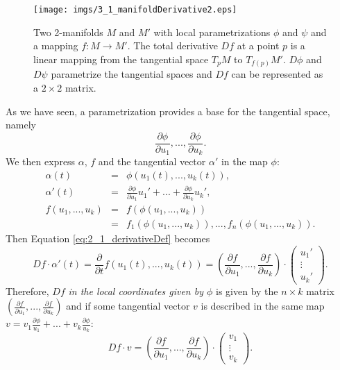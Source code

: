 \begin{figure}
\begin{center}
\texttt{[image: imgs/3\_1\_manifoldDerivative2.eps]}
\end{center}
\caption{Two 2-manifolds $M$ and $M'$ with local parametrizations $\phi$ and $\psi$ and a mapping $f: M \rightarrow M'$. The total derivative $Df$ at a point $p$ is a linear mapping from the tangential space $T_p M$ to $T_{f(p)} M'$. $D\phi$ and $D \psi$ parametrize the tangential spaces and $Df$ can be represented as a $2\times 2$ matrix.}
\label{fig::3_1_manifoldDerivative2}
\end{figure}


As we have seen, a parametrization provides a base for the tangential space, namely 
\[\frac{\partial\phi}{\partial u_1},..., \frac{\partial\phi}{\partial u_k}.\] 
We then express $\alpha$, $f$ and the tangential vector $\alpha'$ in the map $\phi$:
\begin{eqnarray*} \alpha(t) &=& \phi(u_1(t),...,u_k(t)),\\
\alpha'(t) &=& \frac{\partial\phi}{\partial u_1} u_1' + ... + \frac{\partial\phi}{\partial u_k} u_k',\\
 f(u_1,...,u_k) &=& f(\phi(u_1,...,u_k)) \\
 &=& f_1(\phi(u_1,...,u_k)),...,f_n(\phi(u_1,...,u_k)). \end{eqnarray*} 
Then Equation \ref{eq:2_1_derivativeDef} becomes
\[Df \cdot \alpha'(t) = \frac{\partial}{\partial t}f(u_1(t),...,u_k(t)) = (\frac{\partial f}{\partial u_1},..., \frac{\partial f}{\partial u_k}) \cdot \begin{pmatrix}
	u_1' \\ \vdots \\ u_k'\end{pmatrix}.\]
Therefore, $Df$ \emph{in the local coordinates given by $\phi$} is given by the $ n \times k$ matrix $(\frac{\partial f}{\partial u_1},..., \frac{\partial f}{\partial u_k})$ and if some tangential vector $v$ is described in the same map $v = v_1 \frac{\partial \phi}{u_1} +...+ v_k \frac{\partial \phi}{u_k}$:
\[Df \cdot v = (\frac{\partial f}{\partial u_1},..., \frac{\partial f}{\partial u_k}) \cdot \begin{pmatrix}
	v_1 \\ \vdots \\ v_k\end{pmatrix}.\]


